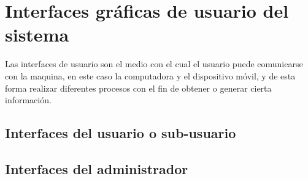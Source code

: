 \section{Interfaces gráficas de usuario del sistema}
Las interfaces de usuario son el medio con el cual el usuario puede comunicarse con la maquina, en este caso la computadora y el dispositivo móvil, y de esta forma realizar diferentes procesos con el fin de obtener o generar cierta información.
\subsection{Interfaces del usuario o sub-usuario}

\subsection{Interfaces del administrador}
